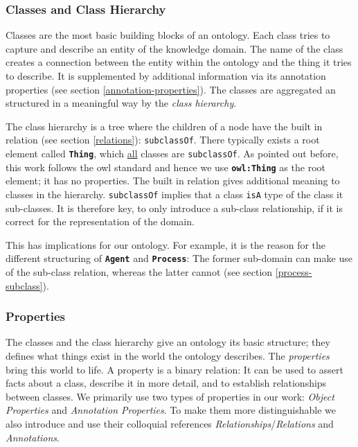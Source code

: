 \documentclass[a4paper, DIV=13, BCOR=0cm]{scrbook}
\newcommand{\class}[1]{\texttt{\textbf{#1}}}
\newcommand{\relation}[1]{\texttt{#1}}
\begin{document}
\subsubsection{Classes and Class Hierarchy }
\label{classes}
Classes are the most basic building blocks of an ontology. Each class tries to capture and describe an entity of the knowledge domain. The name of the class creates a connection between the entity within the ontology and the thing it tries to describe. It is supplemented by additional information via its annotation properties (see section \ref{annotation-properties}). The classes are aggregated an structured in a meaningful way by the \textit{class hierarchy}.

The class hierarchy is a tree where the children of a node have the built in relation (see section \ref{relations}): \relation{subclassOf}. There typically exists a root element called \class{Thing}, which \underline{all} classes are \relation{subclassOf}. As pointed out before, this work follows the \gls{owl} standard and hence we use \class{owl:Thing} as the root element; it has no properties. The built in relation gives additional meaning to classes in the hierarchy. \relation{subclassOf} implies that a class \relation{isA} type of the class it sub-classes. It is therefore key, to only introduce a sub-class relationship, if it is correct for the representation of the domain.

This has implications for our ontology. For example, it is the reason for the different structuring of \class{Agent} and \class{Process}: The former sub-domain can make use of the sub-class relation, whereas the latter cannot (see section \ref{process-subclass}).

\subsubsection{Properties }
The classes and the class hierarchy give an ontology its basic structure; they defines what things exist in the world the ontology describes. The \textit{properties} bring this world to life. A property is a binary relation: It can be used to assert facts about a class, describe it in more detail, and to establish relationships between classes. \cite{w3c-owl-guide} We primarily use two types of properties in our work: \textit{Object Properties} and \textit{Annotation Properties}. To make them more distinguishable we also introduce and use their colloquial references \textit{Relationships}/\textit{Relations} and \textit{Annotations}.
\end{document}
